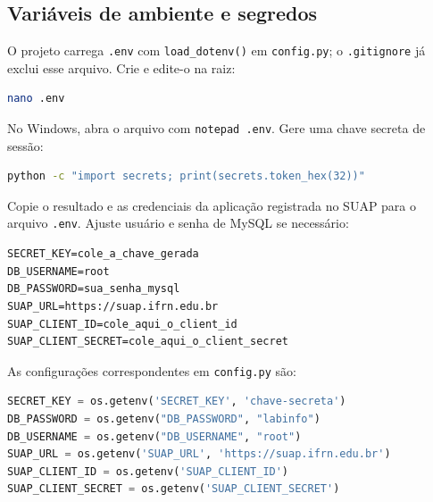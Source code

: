 \documentclass[11pt,a4paper]{article}
\begin{document}
\subsection{Variáveis de ambiente e segredos}
O projeto carrega \texttt{.env} com \texttt{load\_dotenv()} em \texttt{config.py}; o \texttt{.gitignore} já exclui esse arquivo. Crie e edite-o na raiz:
\begin{lstlisting}[language=bash]
nano .env
\end{lstlisting}
No Windows, abra o arquivo com \texttt{notepad .env}. Gere uma chave secreta de sessão:
\begin{lstlisting}[language=bash]
python -c "import secrets; print(secrets.token_hex(32))"
\end{lstlisting}
Copie o resultado e as credenciais da aplicação registrada no SUAP para o arquivo \texttt{.env}. Ajuste usuário e senha de MySQL se necessário:
\begin{lstlisting}
SECRET_KEY=cole_a_chave_gerada
DB_USERNAME=root
DB_PASSWORD=sua_senha_mysql
SUAP_URL=https://suap.ifrn.edu.br
SUAP_CLIENT_ID=cole_aqui_o_client_id
SUAP_CLIENT_SECRET=cole_aqui_o_client_secret
\end{lstlisting}
As configurações correspondentes em \texttt{config.py} são:
\begin{lstlisting}[language=Python]
SECRET_KEY = os.getenv('SECRET_KEY', 'chave-secreta')
DB_PASSWORD = os.getenv("DB_PASSWORD", "labinfo")
DB_USERNAME = os.getenv("DB_USERNAME", "root")
SUAP_URL = os.getenv('SUAP_URL', 'https://suap.ifrn.edu.br')
SUAP_CLIENT_ID = os.getenv('SUAP_CLIENT_ID')
SUAP_CLIENT_SECRET = os.getenv('SUAP_CLIENT_SECRET')
\end{lstlisting}
\end{document}

